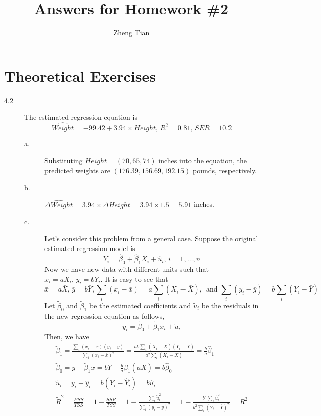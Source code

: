 \documentclass[a4paper,11pt]{article}
\author{Zheng Tian}
\date{}
\title{Answers for Homework \#2}
\begin{document}
\maketitle

\section{Theoretical Exercises}
\label{sec:org2232d0e}

\begin{description}
\item[{4.2}] The estimated regression equation is
\[ \widehat{Weight} = -99.42 + 3.94 \times Height,\, R^2 =
         0.81,\, SER = 10.2 \]
\begin{description}
\item[{a.}] Substituting \(Height = (70, 65, 74)\) inches into the
equation, the predicted weights are \((176.39, 156.69,
          192.15)\) pounds, respectively.
\item[{b.}] \(\widehat{\Delta Weight} = 3.94 \times \Delta Height = 3.94 \times 1.5 =
          5.91\) inches.
\item[{c.}] Let's consider this problem from a general case. Suppose the
original estimated regression model is
\[ Y_i = \hat{\beta}_0 + \hat{\beta}_1 X_i + \hat{u}_i,\, i
          = 1, \ldots, n \]
Now we have new data with different units such that \(x_i =
          aX_i,\, y_i = bY_i\). It is easy to see that
\[ \bar{x} = a
          \bar{X},\, \bar{y} = b \bar{Y}, \sum_i(x_i - \bar{x}) = a
          \sum_i (X_i - \bar{X}),\, \text{ and } \sum_i (y_i - \bar{y}) = b
          \sum_i (Y_i - \bar{Y})
          \]
Let \(\tilde{\beta}_0 \text{ and } \tilde{\beta}_1\) be the estimated
coefficients and \(\tilde{u}_i\) be the residuals in the new
regression equation as follows,
\[ y_i = \tilde{\beta}_0 + \tilde{\beta}_1 x_i + \tilde{u}_i
          \]
Then, we have
\begin{gather*}
\tilde{\beta}_1 = \frac{\sum_i(x_i - \bar{x})(y_i -
\bar{y})}{\sum_i (x_i - \bar{x})^2}
= \frac{ab \sum_i (X_i - \bar{X})(Y_i - \bar{Y})}{a^2 \sum_i (X_i - \bar{X})} = \frac{b}{a} \hat{\beta}_1 \\
\tilde{\beta}_0 = \bar{y} - \tilde{\beta}_1 \bar{x} = b \bar{Y} - \frac{b}{a} \hat{\beta}_1 (a \bar{X}) = b \hat{\beta}_0 \\
\tilde{u}_i = y_i - \hat{y}_i = b (Y_i - \hat{Y}_i) = b \hat{u}_i \\
\tilde{R}^2 = \frac{ESS}{TSS} = 1 - \frac{SSR}{TSS} = 1 - \frac{\sum_i \tilde{u}_i^2}{\sum_i (y_i - \bar{y})^2} = 1 - \frac{b^2 \sum_i \hat{u}_i^2}{b^2 \sum_i (Y_i - \bar{Y})^2} = R^2 \\

\end{gather*}
\end{description}
\end{description}
\end{document}
